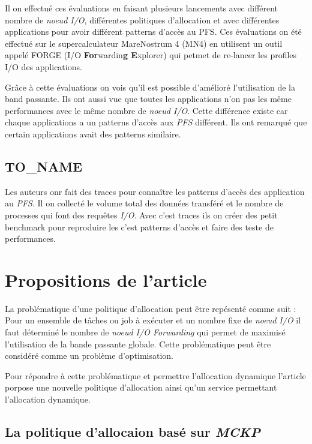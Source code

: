 \documentclass[10pt, a4paper]{article}
\begin{document}
Il on effectué ces évaluations en faisant plusieurs lancements avec différent nombre de \emph{noeud I/O}, différentes politiques d'allocation et avec différentes applications pour avoir différent patterns d'accès au PFS. Ces évaluations on été effectué sur le supercalculateur MareNostrum 4 (MN4) en utilisent un outil appelé FORGE (I/O \textbf{For}wardin\textbf{g E}xplorer) qui petmet de re-lancer les profiles I/O des applications.

Grâce à cette évaluations on vois qu'il est possible d'amélioré l'utilisation de la band passante.
Ils ont aussi vue que toutes les applications n'on pas les même performances avec le même nombre de \emph{noeud I/O}. Cette différence existe car chaque applications a un patterns d'accès aux \emph{PFS} différent. Ils ont remarqué que certain applications avait des patterns similaire.

\subsection{TO_NAME}

Les auteurs onr fait des traces pour connaître les patterns d'accès des application au \emph{PFS}. Il on collecté le volume total des données transféré et le nombre de processes qui font des requêtes \emph{I/O}. Avec c'est traces ils on créer des petit benchmark pour reproduire les c'est patterns d'accès et faire des teste de performances.

\section{Propositions de l'article}

La problématique d'une politique d'allocation peut être repésenté comme suit :
Pour un ensemble de tâches ou job à exécuter et un nombre fixe de \emph{noeud I/O} il faut déterminé le nombre de \emph{noeud I/O Forwarding} qui permet de maximisé l'utilisation de la bande passante globale.
Cette problématique peut être considéré comme un problème d'optimisation.

Pour répondre à cette problématique et permettre l'allocation dynamique l'article porpose une nouvelle politique d'allocation ainsi qu'un service permettant l'allocation dynamique.

\subsection{La politique d'allocaion basé sur \emph{MCKP}}
\end{document}
